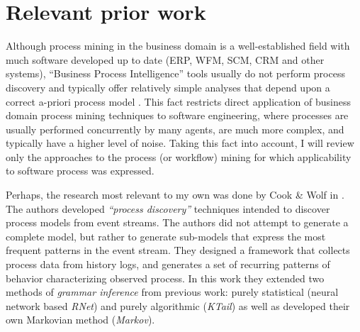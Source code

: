 \documentclass{sig-alternate}
\begin{document}
\section{Relevant prior work}
Although process mining in the business domain is a well-established field with much software developed up to date (ERP, WFM, SCM, CRM and other systems), ``Business Process Intelligence'' tools usually do not perform process discovery and typically offer relatively simple analyses that depend upon a correct a-priori process model \cite{citeulike:5044991} \cite{citeulike:3718014} \cite{citeulike:2678511}. This fact restricts direct application of business domain process mining techniques to software engineering, where processes are usually performed concurrently by many agents, are much more complex, and typically have a higher level of noise. Taking this fact into account, I will review only the approaches to the process (or workflow) mining for which applicability to software process was expressed. 

Perhaps, the research most relevant to my own was done by Cook \& Wolf in \cite{citeulike:328044}. The authors developed \textit{``process discovery''} techniques intended to discover process models from event streams. The authors did not attempt to generate a complete model, but rather to generate sub-models that express the most frequent patterns in the event stream. They designed a framework that collects process data from history logs, and generates a set of recurring patterns of behavior characterizing observed process. In this work they extended two methods of \textit{grammar inference} from previous work: purely statistical (neural network based \textit{RNet}) and purely algorithmic (\textit{KTail}) as well as developed their own Markovian method (\textit{Markov}). 
\end{document}
